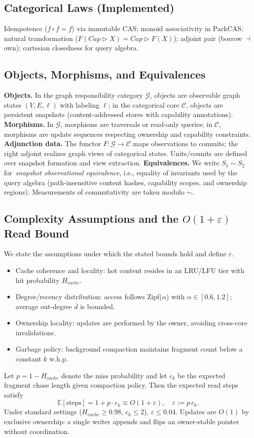 \documentclass[10pt]{article}
\begin{document}
\subsection{Categorical Laws (Implemented)}
Idempotence ($f\circ f=f$) via immutable CAS; monoid associativity in PackCAS;
natural transformation ($F(Cap\triangleright X)=Cap\triangleright F(X)$);
adjoint pair (borrow $\dashv$ own); cartesian closedness for query algebra.

\subsection{Objects, Morphisms, and Equivalences}
\textbf{Objects.} In the graph responsibility category $\mathcal{G}$, objects are observable graph states $(V,E,\ell)$ with labeling $\ell$; in the categorical core $\mathcal{C}$, objects are persistent snapshots (content-addressed stores with capability annotations).
\textbf{Morphisms.} In $\mathcal{G}$, morphisms are traversals or read-only queries; in $\mathcal{C}$, morphisms are update sequences respecting ownership and capability constraints.
\textbf{Adjunction data.} The functor $F\!:\mathcal{G}\to\mathcal{C}$ maps observations to commits; the right adjoint realizes graph views of categorical states. Units/counits are defined over snapshot formation and view extraction.
\textbf{Equivalences.} We write $S_1\sim S_2$ for \,\emph{snapshot observational equivalence}, i.e., equality of invariants used by the query algebra (path-insensitive content hashes, capability scopes, and ownership regions). Measurements of commutativity are taken modulo $\sim$.

\subsection{Complexity Assumptions and the $O(1{+}\varepsilon)$ Read Bound}
We state the assumptions under which the stated bounds hold and define $\varepsilon$.
\begin{itemize}[nosep]
    \item Cache coherence and locality: hot content resides in an LRU/LFU tier with hit probability $H_{cache}$.
    \item Degree/recency distribution: access follows Zipf($\alpha$) with $\alpha\in[0.6,1.2]$; average out-degree $\bar d$ is bounded.
    \item Ownership locality: updates are performed by the owner, avoiding cross-core invalidations.
    \item Garbage policy: background compaction maintains fragment count below a constant $k$ w.h.p.
\end{itemize}
Let $p=1-H_{cache}$ denote the miss probability and let $c_k$ be the expected fragment chase length given compaction policy. Then the expected read steps satisfy
\[
\mathbb{E}[\text{steps}] = 1 + p\cdot c_k \equiv O(1{+}\varepsilon),\quad \varepsilon := p\,c_k.
\]
Under standard settings ($H_{cache}{\ge}0.98$, $c_k{\le}2$), $\varepsilon\le0.04$. Updates are $O(1)$ by exclusive ownership: a single writer appends and flips an owner-stable pointer without coordination.
\end{document}
